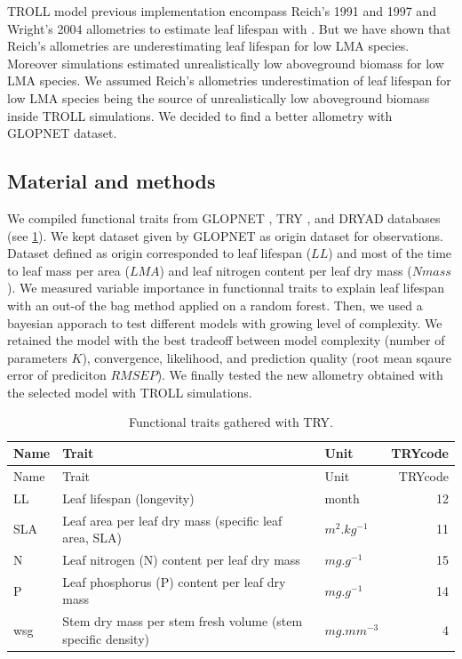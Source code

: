 \documentclass[12pt,]{article}
\theoremstyle{definition}
\theoremstyle{definition}
\theoremstyle{remark}
\begin{document}
TROLL model previous implementation encompass Reich's 1991 and 1997 and
Wright's 2004 allometries to estimate leaf lifespan with
\citep{Reich1991a, Reich1997, wright_worldwide_2004}. But we have shown
that Reich's allometries are underestimating leaf lifespan for low LMA
species. Moreover simulations estimated unrealistically low aboveground
biomass for low LMA species. We assumed Reich's allometries
underestimation of leaf lifespan for low LMA species being the source of
unrealistically low aboveground biomass inside TROLL simulations. We
decided to find a better allometry with \citet{wright_worldwide_2004}
GLOPNET dataset.

\subsection{Material and methods}\label{material-and-methods-1}

We compiled functional traits from GLOPNET
\citep{wright_worldwide_2004}, TRY \citep{Kattge2011}, and DRYAD
\citep{chave_towards_2009} databases (see \ref{tab:A2traits}). We kept
dataset given by GLOPNET as origin dataset for observations. Dataset
defined as origin corresponded to leaf lifespan (\(LL\)) and most of the
time to leaf mass per area (\(LMA\)) and leaf nitrogen content per leaf
dry mass (\(Nmass\)). We measured variable importance in functionnal
traits to explain leaf lifespan with an out-of the bag method applied on
a random forest. Then, we used a bayesian apporach to test different
models with growing level of complexity. We retained the model with the
best tradeoff between model complexity (number of parameters \(K\)),
convergence, likelihood, and prediction quality (root mean sqaure error
of prediciton \(RMSEP\)). We finally tested the new allometry obtained
with the selected model with TROLL simulations.

\begin{longtable}[]{@{}lllr@{}}
\caption{\label{tab:A2traits}Functional traits gathered with
TRY.}\tabularnewline
\toprule
Name & Trait & Unit & TRYcode\tabularnewline
\midrule
\endfirsthead
\toprule
Name & Trait & Unit & TRYcode\tabularnewline
\midrule
\endhead
LL & Leaf lifespan (longevity) & month & 12\tabularnewline
SLA & Leaf area per leaf dry mass (specific leaf area, SLA) &
\(m^2.kg^{-1}\) & 11\tabularnewline
N & Leaf nitrogen (N) content per leaf dry mass & \(mg.g^{-1}\) &
15\tabularnewline
P & Leaf phosphorus (P) content per leaf dry mass & \(mg.g^{-1}\) &
14\tabularnewline
wsg & Stem dry mass per stem fresh volume (stem specific density) &
\(mg.mm^{-3}\) & 4\tabularnewline
\bottomrule
\end{longtable}
\end{document}
